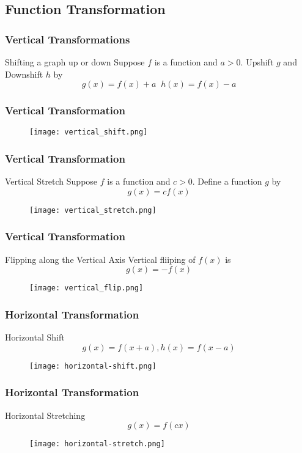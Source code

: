 \subsection{Function Transformation}
\begin{frame}
  \frametitle{Vertical Transformations}

  \begin{block}{Shifting a graph up or down}
    Suppose \(f \) is a function and \(a > 0\). Upshift \(g\) and  Downshift \(h\) by
\[g(x) = f (x) + a \;\; h(x) = f (x) - a \]
  \end{block}
  \frametitle{Vertical Transformation}
  \begin{figure}[h]    
    \centering
    \texttt{[image: vertical\_shift.png]}
    \end{figure}
\end{frame}
\begin{frame}
  \frametitle{Vertical Transformation}
  \begin{block}{Vertical Stretch}
    Suppose \(f\) is a function and \(c > 0\). Define a function \(g\) by
\[g(x) = c f (x)\]
  \end{block}
  \begin{figure}[h]    
    \centering
    \texttt{[image: vertical\_stretch.png]}
    \end{figure}
\end{frame}
\begin{frame}
  \frametitle{Vertical Transformation}
  \begin{block}{Flipping along the Vertical Axis} 
    Vertical fliiping of \(f(x) \) is 
    \[g(x) = - f (x) \]
  \end{block}
  \begin{figure}[h]    
    \centering
    \texttt{[image: vertical\_flip.png]}
    \end{figure}
\end{frame}
\begin{frame}
  \frametitle{Horizontal Transformation}
  \begin{block}{Horizontal Shift}
    \[g(x) = f(x+a), h(x) = f(x-a)\]
  \end{block}
  \begin{figure}[h]    
    \centering
    \texttt{[image: horizontal-shift.png]}
    \end{figure}
  \end{frame}
\begin{frame}
    \frametitle{Horizontal Transformation}
    \begin{block}{Horizontal Stretching}
      \[g(x) = f(cx)\]
    \end{block}
    \begin{figure}[h]    
      \centering
      \texttt{[image: horizontal-stretch.png]}
      \end{figure}
\end{frame}
